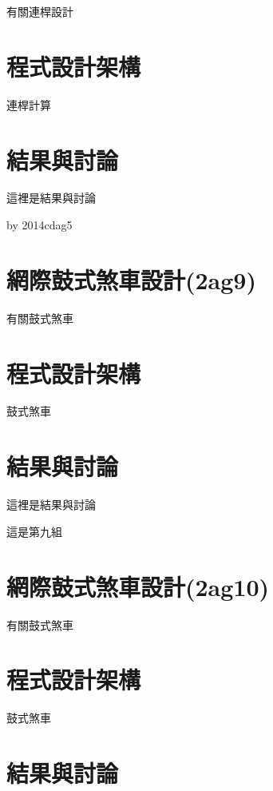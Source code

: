 \documentclass[]{article}
\begin{document}
有關連桿設計

\section{程式設計架構}\label{ux7a0bux5f0fux8a2dux8a08ux67b6ux69cb-4}

連桿計算

\section{結果與討論}\label{ux7d50ux679cux8207ux8a0eux8ad6-4}

這裡是結果與討論

by 2014cdag5

\section{網際鼓式煞車設計(2ag9)}\label{ux7db2ux969bux9f13ux5f0fux715eux8ecaux8a2dux8a082ag9}

有關鼓式煞車

\section{程式設計架構}\label{ux7a0bux5f0fux8a2dux8a08ux67b6ux69cb-5}

鼓式煞車

\section{結果與討論}\label{ux7d50ux679cux8207ux8a0eux8ad6-5}

這裡是結果與討論

這是第九組

\section{網際鼓式煞車設計(2ag10)}\label{ux7db2ux969bux9f13ux5f0fux715eux8ecaux8a2dux8a082ag10}

有關鼓式煞車

\section{程式設計架構}\label{ux7a0bux5f0fux8a2dux8a08ux67b6ux69cb-6}

鼓式煞車

\section{結果與討論}\label{ux7d50ux679cux8207ux8a0eux8ad6-6}
\end{document}
